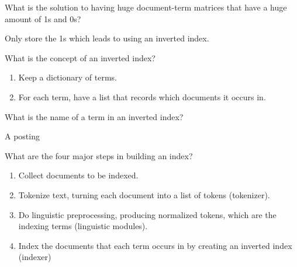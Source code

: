 \documentclass[2by4,grid]{flashcards}
\begin{document}
\begin{flashcard}{What is the solution to having huge document-term matrices that have a huge amount of 1s and 0s?}
	\begin{center}
        Only store the 1s which leads to using an inverted index.
	\end{center}
\end{flashcard}

\begin{flashcard}{What is the concept of an inverted index?}
	\begin{center}
        \begin{enumerate}
            \item Keep a dictionary of terms.
            \item For each term, have a list that records which documents it occurs in.
        \end{enumerate}
	\end{center}
\end{flashcard}

\begin{flashcard}{What is the name of a term in an inverted index?}
	\begin{center}
        A posting
	\end{center}
\end{flashcard}

\begin{flashcard}{What are the four major steps in building an index?}
	\begin{center}
        \begin{enumerate}
            \item Collect documents to be indexed.
            \item Tokenize text, turning each document into a list of tokens (tokenizer).
            \item Do linguistic preprocessing, producing normalized tokens, which are the indexing terms (linguistic modules).
            \item Index the documents that each term occurs in by creating an inverted index (indexer)
        \end{enumerate}
	\end{center}
\end{flashcard}
\end{document}

